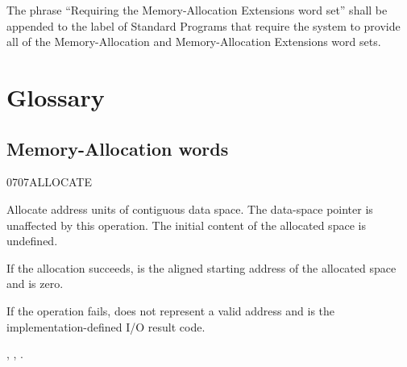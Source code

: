 The phrase ``Requiring the Memory-Allocation Extensions word set''
shall be appended to the label of Standard Programs that require
the system to provide all of the Memory-Allocation and
Memory-Allocation Extensions word sets.


\section{Glossary} %

\subsection{Memory-Allocation words} %


\begin{worddef}{0707}{ALLOCATE}
\item {}

	Allocate  address units of contiguous data space. The
	data-space pointer is unaffected by this operation. The initial
	content of the allocated space is undefined.

	If the allocation succeeds,  is the aligned
	starting address of the allocated space and  is
	zero.

	If the operation fails,  does not represent a valid
	address and  is the implementation-defined I/O result
	code.

\see {},
	,
	.

	\begin{testing}
	\cbstart{}
		 \\
		 \tab {}  \\

		 \\
		 \tab {} 

		 \\
		 \tab {} 
	\cbend
	\end{testing}
\end{worddef}


